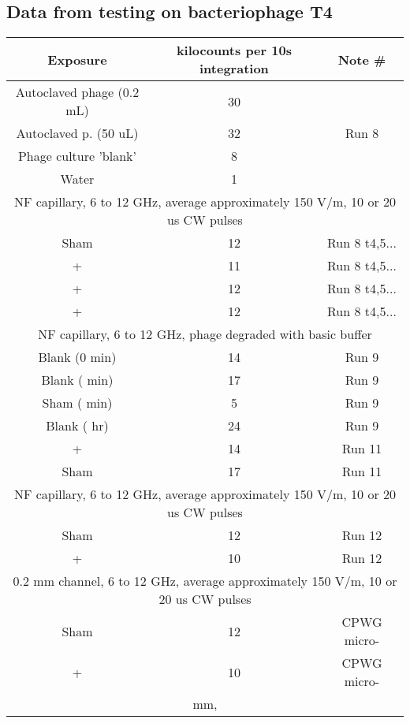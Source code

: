 \documentclass[paper.tex]{subfiles}
\begin{document}
\subsection{Data from testing on bacteriophage T4}
\begin{table}[h!]
	\centering
	\begin{tabular}{ |c|c|c| } 
		\hline
		Exposure & kilocounts per 10s integration & Note \# \\
		\hline
		Autoclaved phage (0.2 mL) & 30 & \\ 
		Autoclaved p. (50 uL) & 32 & Run 8\\ 
		\hline
		Phage culture 'blank' & 8 & \\ 
		Water & 1 & \\

		\hline
		\multicolumn{3}{|c|}{NF capillary, 6 to 12 GHz, average approximately 150 V/m, 10 or 20 us CW pulses} \\
		\hline
		Sham   & 12 & Run 8 t4,5...\\
		+ & 11 & Run 8 t4,5...\\
		+  & 12 & Run 8 t4,5...\\
		+  & 12 & Run 8 t4,5...\\
		\hline
		\multicolumn{3}{|c|}{NF capillary, 6 to 12 GHz, phage degraded with basic buffer} \\
		\hline
		Blank (0 min) & 14 & Run 9\\
		Blank (\ntilde 15 min) & 17 & Run 9\\
		Sham (\ntilde 15 min) & 5 & Run 9\\
		Blank (\ntilde 4 hr) & 24 & Run 9\\
		\hline
		+  & 14 & Run 11\\
		Sham & 17 & Run 11\\
		\hline
		\multicolumn{3}{|c|}{NF capillary, 6 to 12 GHz, average approximately 150 V/m, 10 or 20 us CW pulses} \\
		\hline
		Sham & 12 & Run 12\\
		+    & 10 & Run 12\\
		\hline
		\multicolumn{3}{|c|}{0.2 mm channel, 6 to 12 GHz, average approximately 150 V/m, 10 or 20 us CW pulses} \\
		\hline
		 Sham & 12 & CPWG micro-\\
 		 +    & 10 & CPWG micro-\\
 		\hline
 		
 		
		\multicolumn{3}{|c|}{\ntilde 0.05 mm, \ntilde } \\
		\hline
		

\end{tabular}
\end{table}
\end{document}

